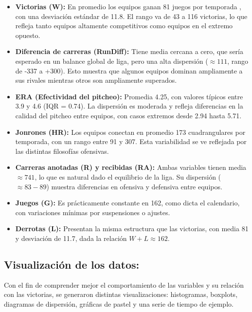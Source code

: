 \documentclass[man,floatsintext]{apa7}
\begin{document}
\begin{itemize}
    \item \textbf{Victorias (W):} En promedio los equipos ganan 81 juegos por temporada , con una desviación estándar de 11.8. El rango va de 43 a 116 victorias, lo que refleja tanto equipos altamente competitivos como equipos en el extremo opuesto.
    \item \textbf{Diferencia de carreras (RunDiff):} Tiene media cercana a cero, que sería esperado en un balance global de liga, pero una alta dispersión ($\approx 111$, rango de -337 a +300). Esto muestra que algunos equipos dominan ampliamente a sus rivales mientras otros son ampliamente superados.
    \item \textbf{ERA (Efectividad del pitcheo):} Promedia 4.25, con valores típicos entre 3.9 y 4.6 (IQR = 0.74). La dispersión es moderada y refleja diferencias en la calidad del pitcheo entre equipos, con casos extremos desde 2.94 hasta 5.71.
    \item \textbf{Jonrones (HR):} Los equipos conectan en promedio 173 cuadrangulares por temporada, con un rango entre 91 y 307. Esta variabilidad se ve reflejada por las distintas filosofías ofensivas.
    \item \textbf{Carreras anotadas (R) y recibidas (RA):} Ambas variables tienen media $\approx 741$, lo que es natural dado el equilibrio de la liga. Su dispersión ($\approx 83-89$) muestra diferencias en ofensiva y defensiva entre equipos.
    \item \textbf{Juegos (G):} Es prácticamente constante en 162, como dicta el calendario, con variaciones mínimas por suspensiones o ajustes.
    \item \textbf{Derrotas (L):} Presentan la misma estructura que las victorias, con media 81 y desviación de 11.7, dada la relación \(W+L \approx 162\).
\end{itemize}
\subsection{Visualización de los datos:}

Con el fin de comprender mejor el comportamiento de las variables y su relación con las victorias, se generaron distintas visualizaciones: histogramas, boxplots, diagramas de dispersión, gráficas de pastel y una serie de tiempo de ejemplo.
\end{document}
